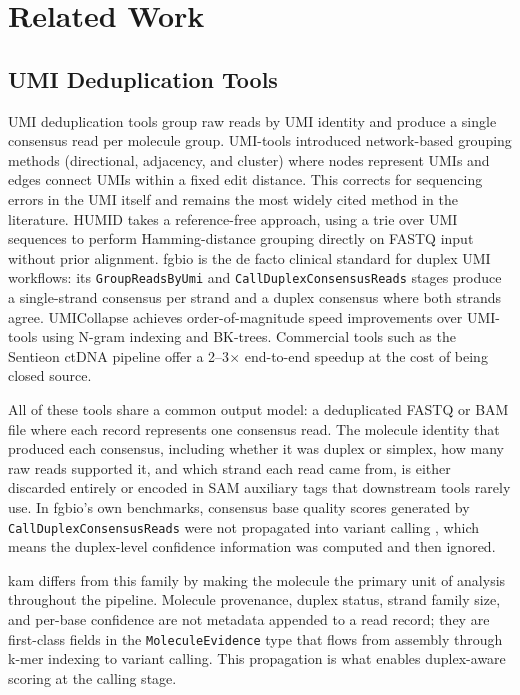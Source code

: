 \section{Related Work}
\label{sec:related_work}

\subsection{UMI Deduplication Tools}

UMI deduplication tools group raw reads by UMI identity and produce a single consensus read per molecule group. UMI-tools \autocite{Smith17umitools} introduced network-based grouping methods (directional, adjacency, and cluster) where nodes represent UMIs and edges connect UMIs within a fixed edit distance. This corrects for sequencing errors in the UMI itself and remains the most widely cited method in the literature. HUMID \autocite{Langedijk22humid} takes a reference-free approach, using a trie over UMI sequences to perform Hamming-distance grouping directly on FASTQ input without prior alignment. fgbio \autocite{fgbio} is the de facto clinical standard for duplex UMI workflows: its \texttt{GroupReadsByUmi} and \texttt{CallDuplexConsensusReads} stages produce a single-strand consensus per strand and a duplex consensus where both strands agree. UMICollapse \autocite{Liu19umicollapse} achieves order-of-magnitude speed improvements over UMI-tools using N-gram indexing and BK-trees. Commercial tools such as the Sentieon ctDNA pipeline offer a 2--3$\times$ end-to-end speedup at the cost of being closed source.

All of these tools share a common output model: a deduplicated FASTQ or BAM file where each record represents one consensus read. The molecule identity that produced each consensus, including whether it was duplex or simplex, how many raw reads supported it, and which strand each read came from, is either discarded entirely or encoded in SAM auxiliary tags that downstream tools rarely use. In fgbio's own benchmarks, consensus base quality scores generated by \texttt{CallDuplexConsensusReads} were not propagated into variant calling \autocite{fgbio}, which means the duplex-level confidence information was computed and then ignored.

kam differs from this family by making the molecule the primary unit of analysis throughout the pipeline. Molecule provenance, duplex status, strand family size, and per-base confidence are not metadata appended to a read record; they are first-class fields in the \texttt{MoleculeEvidence} type that flows from assembly through k-mer indexing to variant calling. This propagation is what enables duplex-aware scoring at the calling stage.

